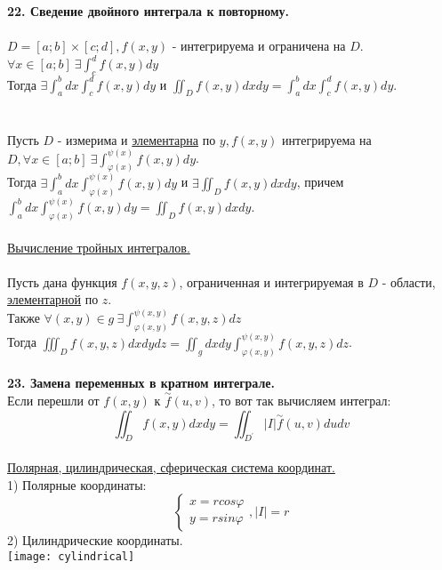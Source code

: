 \documentclass[12pt]{article}
\begin{document}
\label{question22_1}\textbf{22. Сведение двойного интеграла к повторному.}\\
\\
$D = [a;b] \times [c;d], f(x,y)$ - интегрируема и ограничена на $D$.\\
$\forall x \in [a;b] \ \exists \int_c^d f(x,y) dy$\\
Тогда $\exists \int_a^b dx \int_c^d f(x,y) dy$ и $\iint_D f(x,y) dxdy = \int_a^b dx \int_c^d f(x,y) dy$.\\
\\
\\
Пусть $D$ - измерима и \hyperref[elementaryDomain]{элементарна} по $y, f(x,y)$ интегрируема на $D, \forall x \in [a;b] \ \exists \int_{\varphi(x)}^{\psi(x)} f(x,y)dy$.\\
Тогда $\exists \int_a^b dx \int_{\varphi(x)}^{\psi(x)} f(x,y)dy$ и $\exists \iint_D f(x,y)dxdy$, причем $\int_a^b dx \int_{\varphi(x)}^{\psi(x)} f(x,y)dy = \iint_D f(x,y)dxdy$.\\
\\
\label{question22_2}\uline{Вычисление тройных интегралов.}\\
\\
Пусть дана функция $f(x,y,z)$, ограниченная и интегрируемая в $D$ - области, \hyperref[elementaryDomain]{элементарной} по $z$.\\
Также $\forall (x,y) \in g \ \exists \int_{\varphi(x,y)}^{\psi(x,y)} f(x,y,z) dz$\\
Тогда $\iiint_D f(x,y,z)dxdydz = \iint_g dxdy \int_{\varphi(x,y)}^{\psi(x,y)} f(x,y,z)dz$.\\
\\
\label{question23_1}\textbf{23. Замена переменных в кратном интеграле.}\\
Если перешли от $f(x,y)$ к $\overset{\sim}{f}(u,v)$, то вот так вычисляем интеграл:\\
$$\iint_D f(x,y) dxdy = \iint_{D^{'}} |I|\overset{\sim}{f}(u,v) dudv$$
\\
\label{question23_2}\uline{Полярная, цилиндрическая, сферическая система координат.}\\
1) Полярные координаты:\\
$$\begin{cases}x=rcos\varphi \\ y=rsin\varphi \end{cases},|I| = r$$
2) Цилиндрические координаты.\\
\texttt{[image: cylindrical]}\\
\end{document}
